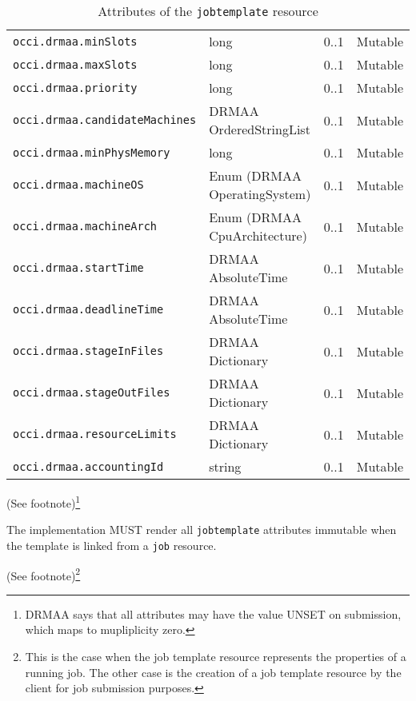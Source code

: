 \documentclass[10pt]{article}
\newcommand{\h}[1]{\lstinline|#1|}
\newcommand{\rat}[1]{ {\tiny(See footnote)}\footnote{#1} }
\begin{document}
\begin{table}[ht]
\begin{tabularx}{\textwidth}{|l|X|l|l|}
\h{occi.drmaa.minSlots}            & long                         & 0..1         & Mutable   \\ 
\h{occi.drmaa.maxSlots}            & long                         & 0..1         & Mutable   \\ 
\h{occi.drmaa.priority}            & long                         & 0..1         & Mutable   \\ 
\h{occi.drmaa.candidateMachines}   & DRMAA OrderedStringList      & 0..1         & Mutable   \\ 
\h{occi.drmaa.minPhysMemory}       & long                         & 0..1         & Mutable   \\ 
\h{occi.drmaa.machineOS}           & Enum (DRMAA OperatingSystem) & 0..1         & Mutable   \\
\h{occi.drmaa.machineArch}         & Enum (DRMAA CpuArchitecture) & 0..1         & Mutable   \\
\h{occi.drmaa.startTime}           & DRMAA AbsoluteTime           & 0..1         & Mutable   \\
\h{occi.drmaa.deadlineTime}        & DRMAA AbsoluteTime           & 0..1         & Mutable   \\
\h{occi.drmaa.stageInFiles}        & DRMAA Dictionary             & 0..1         & Mutable   \\
\h{occi.drmaa.stageOutFiles}       & DRMAA Dictionary             & 0..1         & Mutable   \\
\h{occi.drmaa.resourceLimits}      & DRMAA Dictionary             & 0..1         & Mutable   \\
\h{occi.drmaa.accountingId}        & string                       & 0..1         & Mutable   \\
\hline
\end{tabularx}
\caption{Attributes of the \h{jobtemplate} resource}
\label{tab:jobtemplateattributes}
\end{table}

\rat{DRMAA says that all attributes may have the value UNSET on submission, which maps to mupliplicity zero.}

The implementation MUST render all \h{jobtemplate} attributes immutable when the template is linked from a \h{job} resource.

\rat{This is the case when the job template resource represents the properties of a running job. The other case is the creation of a job template resource by the client for job submission purposes.}

\end{document}
